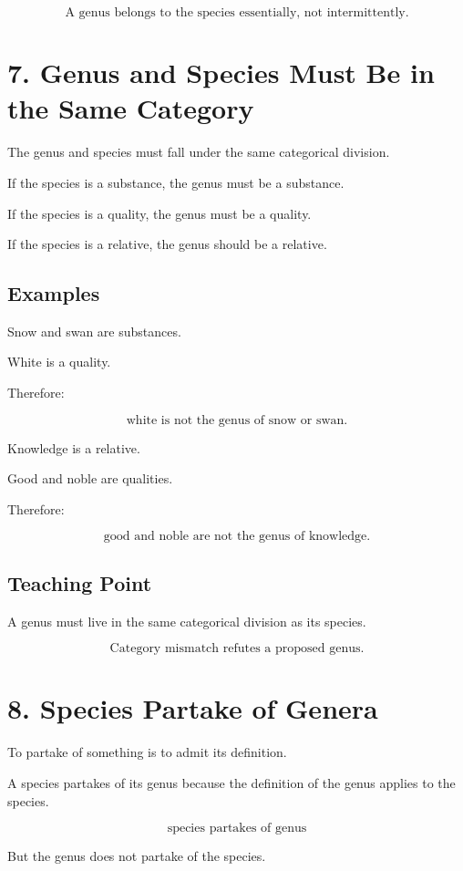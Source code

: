 \documentclass[12pt]{article}
\begin{document}
\[
\boxed{
\text{A genus belongs to the species essentially, not intermittently.}
}
\]

\section*{7. Genus and Species Must Be in the Same Category}

The genus and species must fall under the same categorical division.

If the species is a substance, the genus must be a substance.

If the species is a quality, the genus must be a quality.

If the species is a relative, the genus should be a relative.

\subsection*{Examples}

Snow and swan are substances.

White is a quality.

Therefore:

\[
\text{white is not the genus of snow or swan.}
\]

Knowledge is a relative.

Good and noble are qualities.

Therefore:

\[
\text{good and noble are not the genus of knowledge.}
\]

\subsection*{Teaching Point}

A genus must live in the same categorical division as its species.

\[
\boxed{
\text{Category mismatch refutes a proposed genus.}
}
\]

\section*{8. Species Partake of Genera}

To partake of something is to admit its definition.

A species partakes of its genus because the definition of the genus applies to
the species.

\[
\text{species partakes of genus}
\]

But the genus does not partake of the species.
\end{document}
